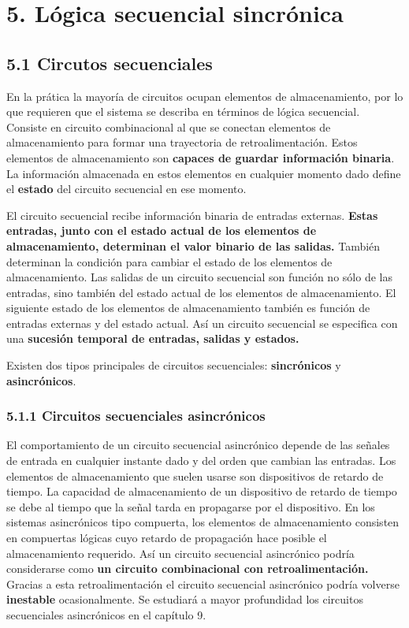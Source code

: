 \newpage
\section*{5. L\'{o}gica secuencial sincr\'{o}nica}
\subsection*{5.1 Circutos secuenciales}
En la pr\'{a}tica la mayor\'{i}a de circuitos ocupan elementos de almacenamiento, por lo
que requieren que el sistema se describa en t\'{e}rminos de l\'{o}gica secuencial.
Consiste en circuito combinacional al que se conectan elementos de almacenamiento para 
formar una trayectoria de retroalimentaci\'{o}n. Estos elementos de almacenamiento son
\textbf{capaces de guardar informaci\'{o}n binaria}. La informaci\'{o}n almacenada en 
estos elementos en cualquier momento dado define el \textbf{estado} del circuito secuencial
en ese momento. 

El circuito secuencial recibe informaci\'{o}n binaria de entradas externas. \textbf{Estas entradas,
junto con el estado actual de los elementos de almacenamiento, determinan el valor binario de
las salidas.} Tambi\'{e}n determinan la condici\'{o}n para cambiar el estado de los elementos de
almacenamiento.
Las salidas de un circuito secuencial son funci\'{o}n no s\'{o}lo de las entradas, sino tambi\'{e}n
del estado actual de los elementos de almacenamiento. El siguiente estado de los elementos de almacenamiento
tambi\'{e}n es funci\'{o}n de entradas externas y del estado actual. As\'{i} un circuito secuencial
se especifica con una \textbf{sucesi\'{o}n temporal de entradas, salidas y estados.}

Existen dos tipos principales de circuitos secuenciales: \textbf{sincr\'{o}nicos} y \textbf{asincr\'{o}nicos}.

\subsubsection*{5.1.1 Circuitos secuenciales asincr\'{o}nicos}
El comportamiento de un circuito secuencial asincr\'{o}nico depende de las se\~{n}ales de entrada
en cualquier instante dado y del orden que cambian las entradas.
Los elementos de almacenamiento que suelen usarse son dispositivos de retardo de tiempo. La capacidad
de almacenamiento de un dispositivo de retardo de tiempo se debe al tiempo que la se\~{n}al tarda en 
propagarse por el dispositivo. En los sistemas asincr\'{o}nicos tipo compuerta, los elementos de almacenamiento
consisten en compuertas l\'{o}gicas cuyo retardo de propagaci\'{o}n hace posible el almacenamiento requerido.
As\'{i} un circuito secuencial asincr\'{o}nico podr\'{i}a considerarse como \textbf{un circuito combinacional
con retroalimentaci\'{o}n.} Gracias a esta retroalimentaci\'{o}n el circuito secuencial asincr\'{o}nico podr\'{i}a
volverse \textbf{inestable} ocasionalmente. Se estudiar\'{a} a mayor profundidad los circuitos secuenciales asincr\'{o}nicos
en el cap\'{i}tulo 9.

